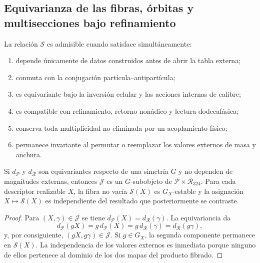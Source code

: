 \subsection{Equivarianza de las fibras, órbitas y multisecciones bajo refinamiento}

\begin{definition}
La relación \(\mathscr S\) es admisible cuando satisface simultáneamente:
\begin{enumerate}
\item depende únicamente de datos construidos antes de abrir la tabla externa;
\item conmuta con la conjugación partícula--antipartícula;
\item es equivariante bajo la inversión celular y las acciones internas de
      calibre;
\item es compatible con refinamiento, retorno nonádico y lectura
      dodecafásica;
\item conserva toda multiplicidad no eliminada por un acoplamiento físico;
\item permanece invariante al permutar o reemplazar los valores externos de
      masa y anchura.
\end{enumerate}
\end{definition}

\begin{theorem}
Si \(d_{\mathcal P}\) y \(d_{\mathcal R}\) son equivariantes respecto de una
simetría \(G\) y no dependen de magnitudes externas, entonces \(\mathcal J\)
es un \(G\)-subobjeto de \(\mathcal P\times\mathcal R_{324}\). Para cada
descriptor realizable \(X\), la fibra no vacía \(\mathscr S(X)\) es
\(G_X\)-estable y la asignación \(X\mapsto\mathscr S(X)\) es independiente del
resultado que posteriormente se contraste.
\end{theorem}

\begin{proof}
Para \((X,\gamma)\in\mathcal J\) se tiene
\(d_{\mathcal P}(X)=d_{\mathcal R}(\gamma)\). La equivariancia da
\[
 d_{\mathcal P}(gX)=g\,d_{\mathcal P}(X)
 =g\,d_{\mathcal R}(\gamma)=d_{\mathcal R}(g\gamma),
\]
y, por consiguiente, \((gX,g\gamma)\in\mathcal J\). Si \(g\in G_X\), la
segunda componente permanece en \(\mathscr S(X)\). La independencia de los
valores externos es inmediata porque ninguno de ellos pertenece al dominio
de los dos mapas del producto fibrado.
\end{proof}

